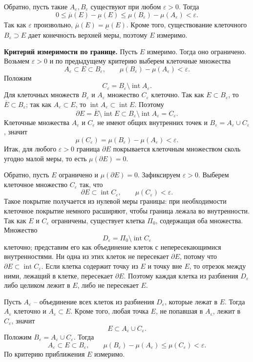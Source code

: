 \documentclass[12pt,a4paper]{article}
\newcommand{\eps}{\varepsilon}
\newcommand{\Int}{\operatorname{int}}
\newcommand{\Fr}{\partial}
\newcommand{\lowmu}{\underline{\mu}}
\newcommand{\upmu}{\overline{\mu}}
\begin{document}
Обратно, пусть такие \(A_\eps,B_\eps\) существуют при любом \(\eps>0\). Тогда
\[
  0\le \upmu(E)-\lowmu(E)
  \le \mu(B_\eps)-\mu(A_\eps)<\eps.
\]
Так как \(\eps\) произвольно, \(\upmu(E)=\lowmu(E)\). Кроме того, существование
клеточного \(B_\eps\supset E\) дает конечность верхней меры, поэтому \(E\)
измеримо.

\textbf{Критерий измеримости по границе.}
Пусть \(E\) измеримо. Тогда оно ограничено. Возьмем \(\eps>0\) и по
предыдущему критерию выберем клеточные множества
\[
  A_\eps\subset E\subset B_\eps,\qquad
  \mu(B_\eps)-\mu(A_\eps)<\eps.
\]
Положим
\[
  C_\eps=B_\eps\setminus \Int A_\eps.
\]
Для клеточных множеств \(B_\eps\) и \(A_\eps\) множество \(C_\eps\) клеточно.
Так как \(E\subset B_\eps\), то \(\overline E\subset B_\eps\); так как
\(A_\eps\subset E\), то \(\Int A_\eps\subset\Int E\). Поэтому
\[
  \Fr E=\overline E\setminus\Int E
  \subset B_\eps\setminus\Int A_\eps=C_\eps.
\]
Клеточные множества \(A_\eps\) и \(C_\eps\) не имеют общих внутренних точек и
\(B_\eps=A_\eps\cup C_\eps\), значит
\[
  \mu(C_\eps)=\mu(B_\eps)-\mu(A_\eps)<\eps.
\]
Итак, для любого \(\eps>0\) граница \(\Fr E\) покрывается клеточным множеством
сколь угодно малой меры, то есть \(\mu(\Fr E)=0\).

Обратно, пусть \(E\) ограничено и \(\mu(\Fr E)=0\). Зафиксируем \(\eps>0\).
Выберем клеточное множество \(C_\eps\) так, что
\[
  \Fr E\subset \Int C_\eps,\qquad \mu(C_\eps)<\eps.
\]
Такое покрытие получается из нулевой меры границы: при необходимости клеточное
покрытие немного расширяют, чтобы граница лежала во внутренности. Так как
\(E\) и \(C_\eps\) ограничены, существует клетка \(\Pi_0\), содержащая оба
множества. Множество
\[
  D_\eps=\Pi_0\setminus \Int C_\eps
\]
клеточно; представим его как объединение клеток с непересекающимися
внутренностями. Ни одна из этих клеток не пересекает \(\Fr E\), потому что
\(\Fr E\subset\Int C_\eps\). Если клетка содержит точку из \(E\) и точку вне
\(E\), то отрезок между ними, лежащий в клетке, пересекает \(\Fr E\). Поэтому
каждая клетка из разбиения \(D_\eps\) либо целиком лежит в \(E\), либо не
пересекает \(E\).

Пусть \(A_\eps\) -- объединение всех клеток из разбиения \(D_\eps\), которые
лежат в \(E\). Тогда \(A_\eps\) клеточно и \(A_\eps\subset E\). Кроме того,
любая точка \(E\), не попавшая в \(A_\eps\), лежит в \(C_\eps\), значит
\[
  E\subset A_\eps\cup C_\eps.
\]
Положим \(B_\eps=A_\eps\cup C_\eps\). Тогда
\[
  A_\eps\subset E\subset B_\eps,
  \qquad
  \mu(B_\eps)-\mu(A_\eps)\le \mu(C_\eps)<\eps.
\]
По критерию приближения \(E\) измеримо.
\end{document}
